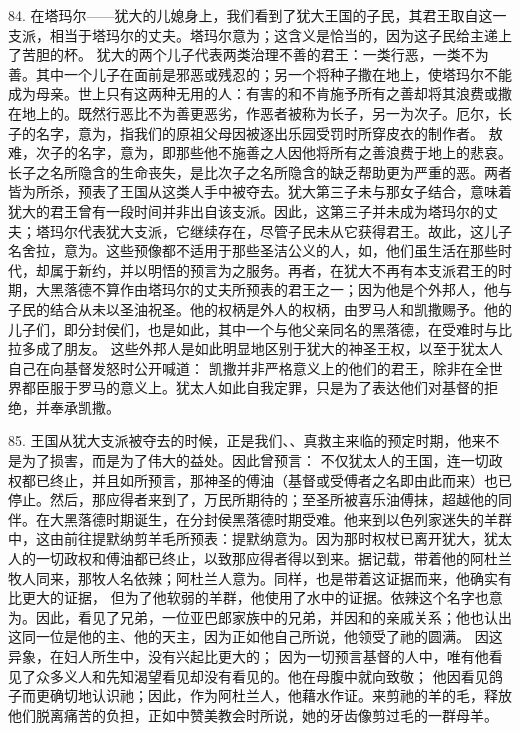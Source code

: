 84. 在塔玛尔——犹大的儿媳身上，我们看到了犹大王国的子民，其君王取自这一支派，相当于塔玛尔的丈夫。塔玛尔意为；这含义是恰当的，因为这子民给主递上了苦胆的杯。 犹大的两个儿子代表两类治理不善的君王：一类行恶，一类不为善。其中一个儿子在面前是邪恶或残忍的；另一个将种子撒在地上，使塔玛尔不能成为母亲。世上只有这两种无用的人：有害的和不肯施予所有之善却将其浪费或撒在地上的。既然行恶比不为善更恶劣，作恶者被称为长子，另一为次子。厄尔，长子的名字，意为，指我们的原祖父母因被逐出乐园受罚时所穿皮衣的制作者。 敖难，次子的名字，意为，即那些他不施善之人因他将所有之善浪费于地上的悲哀。长子之名所隐含的生命丧失，是比次子之名所隐含的缺乏帮助更为严重的恶。两者皆为所杀，预表了王国从这类人手中被夺去。犹大第三子未与那女子结合，意味着犹大的君王曾有一段时间并非出自该支派。因此，这第三子并未成为塔玛尔的丈夫；塔玛尔代表犹大支派，它继续存在，尽管子民未从它获得君王。故此，这儿子名舍拉，意为。这些预像都不适用于那些圣洁公义的人，如，他们虽生活在那些时代，却属于新约，并以明悟的预言为之服务。再者，在犹大不再有本支派君王的时期，大黑落德不算作由塔玛尔的丈夫所预表的君王之一；因为他是个外邦人，他与子民的结合从未以圣油祝圣。他的权柄是外人的权柄，由罗马人和凯撒赐予。他的儿子们，即分封侯们，也是如此，其中一个与他父亲同名的黑落德，在受难时与比拉多成了朋友。 这些外邦人是如此明显地区别于犹大的神圣王权，以至于犹太人自己在向基督发怒时公开喊道： 凯撒并非严格意义上的他们的君王，除非在全世界都臣服于罗马的意义上。犹太人如此自我定罪，只是为了表达他们对基督的拒绝，并奉承凯撒。\par

85. 王国从犹大支派被夺去的时候，正是我们、、真救主来临的预定时期，他来不是为了损害，而是为了伟大的益处。因此曾预言： 不仅犹太人的王国，连一切政权都已终止，并且如所预言，那神圣的傅油（基督或受傅者之名即由此而来）也已停止。然后，那应得者来到了，万民所期待的；至圣所被喜乐油傅抹，超越他的同伴。在大黑落德时期诞生，在分封侯黑落德时期受难。他来到以色列家迷失的羊群中，这由前往提默纳剪羊毛所预表：提默纳意为。因为那时权杖已离开犹大，犹太人的一切政权和傅油都已终止，以致那应得者得以到来。据记载，带着他的阿杜兰牧人同来，那牧人名依辣；阿杜兰人意为。同样，也是带着这证据而来，他确实有比更大的证据， 但为了他软弱的羊群，他使用了水中的证据。依辣这个名字也意为。因此，看见了兄弟，一位亚巴郎家族中的兄弟，并因和的亲戚关系；他也认出这同一位是他的主、他的天主，因为正如他自己所说，他领受了祂的圆满。 因这异象，在妇人所生中，没有兴起比更大的； 因为一切预言基督的人中，唯有他看见了众多义人和先知渴望看见却没有看见的。他在母腹中就向致敬； 他因看见鸽子而更确切地认识祂；因此，作为阿杜兰人，他藉水作证。来剪祂的羊的毛，释放他们脱离痛苦的负担，正如中赞美教会时所说，她的牙齿像剪过毛的一群母羊。\par

